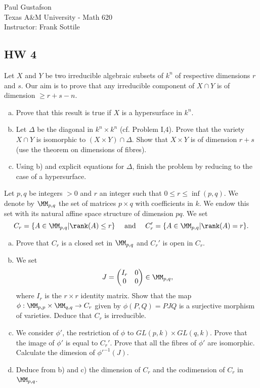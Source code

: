 \documentclass{article}
\begin{document}
\noindent Paul Gustafson\\
\noindent Texas A\&M University - Math 620\\ 
\noindent Instructor: Frank Sottile

\subsection*{HW 4} %
 Let $X$ and $Y$ be two irreducible algebraic subsets of $k^n$ of respective dimensions $r$ and $s$. 
Our aim is to prove that any irreducible component of $X \cap Y$ is of dimension $\ge r + s -n $.
\begin{enumerate}[a)]
\item Prove that this result is true if $X$ is a hypersurface in $k^n$.
\item Let $\Delta$ be the diagonal in $k^n \times k^n$ (cf. Problem I,4). Prove that
the variety $X \cap Y$ is isomorphic to $(X \times Y) \cap \Delta$. Show that $X \times Y$
is of dimension $r + s$ (use the theorem on dimensions of fibres).
\item Using b) and explicit equations for $\Delta$, finish the problem by reducing to
the case of a hypersurface.
\end{enumerate}

 Let $p,q$ be integers $ > 0$ and $r$ an integer such that $0 \le r \le \inf(p,q)$. We
denote by $\MM_{p,q}$ the set of matrices $p \times q$ with coefficients in $k$. We endow
this set with its natural affine space structure of dimension $pq$. We set
$$C_r = \{A \in \MM_{p,q} \vert \rank(A) \le r \} \quad \text{ and } \quad 
 C_r' = \{A \in \MM_{p,q} \vert \rank(A) = r \}.$$
\begin{enumerate}[a)]
\item Prove that $C_r$ is a closed set in $\MM_{p,q}$ and $C_r'$ is open in $C_r$.
\item We set
$$J = \begin{pmatrix}
   I_r & 0
\\ 0 & 0
\end{pmatrix}
\in \MM_{p,q},
$$
where $I_r$ is the $r \times r$ identity matrix. Show that the map $\phi: \MM_{p,p} \times \MM_{q,q} \to C_r$
given by $\phi(P,Q) = PJQ$ is a surjective morphism of varieties. Deduce that $C_r$ is irreducible.
\item We consider $\phi'$, the restriction of $\phi$ to $GL(p,k) \times GL(q,k)$. Prove that the image
of $\phi'$ is equal to $C_r'$. Prove that all the fibres of $\phi'$ are isomorphic. Calculate the
dimesion of $\phi'^{-1}(J)$.
\item Deduce from b) and c) the dimension of $C_r$ and the codimension of $C_r$ in $\MM_{p,q}$.
\end{enumerate}
\end{document}
